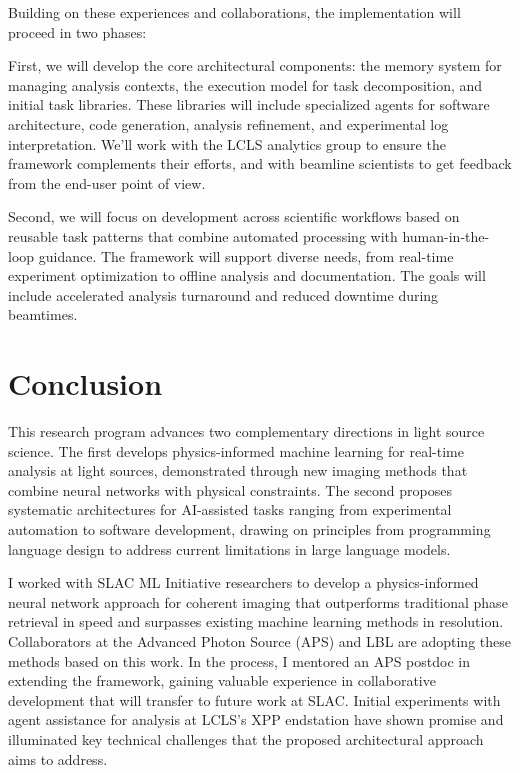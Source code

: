 \documentclass{article}
\begin{document}
Building on these experiences and collaborations, the implementation will proceed in two phases:

First, we will develop the core architectural components: the memory system for managing analysis contexts, the execution model for task decomposition, and initial task libraries. These libraries will include specialized agents for software architecture, code generation, analysis refinement, and experimental log interpretation. We'll work with the LCLS analytics group to ensure the framework complements their efforts, and with beamline scientists to get feedback from the end-user point of view.

Second, we will focus on development across scientific workflows based on reusable task patterns that combine automated processing with human-in-the-loop guidance. The framework will support diverse needs, from real-time experiment optimization to offline analysis and documentation. The goals will include accelerated analysis turnaround and reduced downtime during beamtimes.

\section{Conclusion}
This research program advances two complementary directions in light source science. The first develops physics-informed machine learning for real-time analysis at light sources, demonstrated through new imaging methods that combine neural networks with physical constraints. The second proposes systematic architectures for AI-assisted tasks ranging from experimental automation to software development, drawing on principles from programming language design to address current limitations in large language models.

I worked with SLAC ML Initiative researchers to develop a physics-informed neural network approach for coherent imaging that outperforms traditional phase retrieval in speed and surpasses existing machine learning methods in resolution. Collaborators at the Advanced Photon Source (APS) and LBL are adopting these methods based on this work. In the process, I mentored an APS postdoc in extending the framework, gaining valuable experience in collaborative development that will transfer to future work at SLAC. Initial experiments with agent assistance for analysis at LCLS's XPP endstation have shown promise and illuminated key technical challenges that the proposed architectural approach aims to address.
\end{document}
